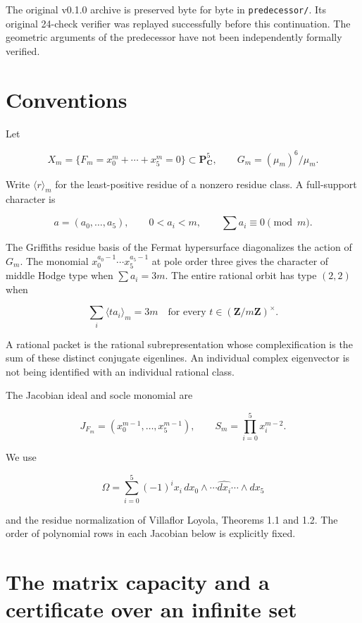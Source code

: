 The original v0.1.0 archive is preserved byte for byte in
\texttt{predecessor/}. Its original 24-check verifier was replayed
successfully before this continuation. The geometric arguments of the
predecessor have not been independently formally verified.

\hypertarget{capacity_cycles-conventions}{%
\section{Conventions}\label{capacity_cycles-conventions}}

Let

\[
X_m=\{F_m=x_0^m+\cdots+x_5^m=0\}\subset\mathbf P^5_{\mathbf C},
\qquad G_m=(\mu_m)^6/\mu_m.
\]

Write \(\langle r\rangle_m\) for the least-positive residue of a nonzero
residue class. A full-support character is

\[
a=(a_0,\ldots,a_5),\qquad 0<a_i<m,\qquad \sum a_i\equiv0\pmod m.
\]

The Griffiths residue basis of the Fermat hypersurface diagonalizes the
action of \(G_m\). The monomial \(x_0^{a_0-1}\cdots x_5^{a_5-1}\) at
pole order three gives the character of middle Hodge type when
\(\sum a_i=3m\). The entire rational orbit has type \((2,2)\) when

\begin{equation}\label{eq:capacity_cycles-1.1}
\sum_i\langle ta_i\rangle_m=3m
\quad\text{for every }t\in(\mathbf Z/m\mathbf Z)^\times.\end{equation}

A rational packet is the rational subrepresentation whose
complexification is the sum of these distinct conjugate eigenlines. An
individual complex eigenvector is not being identified with an
individual rational class.

The Jacobian ideal and socle monomial are

\begin{equation}\label{eq:capacity_cycles-1.2}
J_{F_m}=(x_0^{m-1},\ldots,x_5^{m-1}),\qquad
S_m=\prod_{i=0}^5x_i^{m-2}.\end{equation}

We use

\[
\Omega=\sum_{i=0}^5(-1)^ix_i\,dx_0\wedge\cdots\widehat{dx_i}\cdots\wedge dx_5
\]

and the residue normalization of Villaflor Loyola, Theorems 1.1 and 1.2.
The order of polynomial rows in each Jacobian below is explicitly fixed.

\hypertarget{capacity_cycles-the-matrix-capacity-and-a-certificate-over-an-infinite-set}{%
\section{The matrix capacity and a certificate over an infinite
set}\label{capacity_cycles-the-matrix-capacity-and-a-certificate-over-an-infinite-set}}

